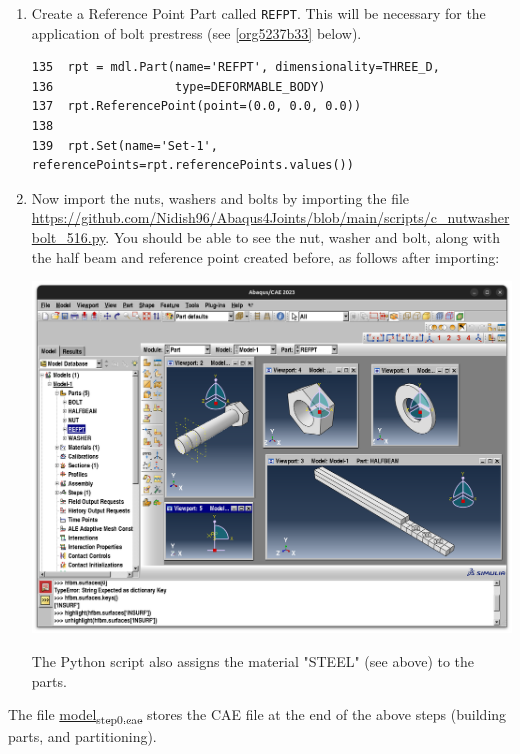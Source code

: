\documentclass[11pt]{article}
\begin{document}
\begin{enumerate}
\item Create a Reference Point Part called \texttt{REFPT}.
This will be necessary for the application of bolt prestress (see \ref{org5237b33} below).
\begin{verbatim}
135  rpt = mdl.Part(name='REFPT', dimensionality=THREE_D, 
136                 type=DEFORMABLE_BODY)
137  rpt.ReferencePoint(point=(0.0, 0.0, 0.0))
138  
139  rpt.Set(name='Set-1', referencePoints=rpt.referencePoints.values())
\end{verbatim}
\item Now import the nuts, washers and bolts by importing the file \url{https://github.com/Nidish96/Abaqus4Joints/blob/main/scripts/c\_nutwasherbolt\_516.py}.
You should be able to see the nut, washer and bolt, along with the half beam and reference point created before, as follows after importing:
\begin{center}
\includegraphics[width=.9\linewidth]{./figs/nwb.png}
\end{center}
The Python script also assigns the material "STEEL" (see above) to the parts.
\end{enumerate}

The file \href{https://github.com/Nidish96/Abaqus4Joints/blob/main/assets/assembly/model\_step0.cae}{model\textsubscript{step0.cae}} stores the CAE file at the end of the above steps (building parts, and partitioning).
\end{document}
